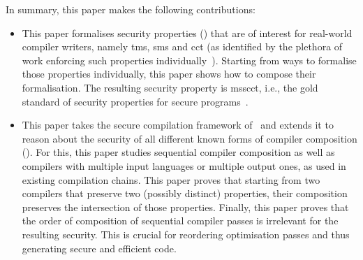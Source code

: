 \documentclass[utf8,acmsmall,review,screen,dvipsnames,anonymous]{acmart}
\begin{document}
In summary, this paper makes the following contributions:
\begin{itemize}
  \item %
        This paper formalises security properties () that are of interest for real-world compiler writers, namely \gls*{tms}, \gls*{sms} and \gls*{cct} (as identified by the plethora of work enforcing such properties individually~\cite{akritidis2009baggy,nagarakatte2009soft,nagarakatte2010cets,dhumbumroong2020boundwarden,jung2021pico,nam2019framer,shankaranarayana2023tailcheck,younan2010paricheck,zhou2023fatptrs,bond2017vale,almeida2017jasmin,kuepper2023cryptopt,cauligi2019fact}).
        Starting from ways to formalise those properties individually, this paper shows how to compose their formalisation.
        The resulting security property is \gls*{msscct}, i.e., the gold standard of security properties for secure programs~\cite{lemay2021ccc}.

  \item %
        This paper takes the secure compilation framework of~\citep{abate2019jour} and extends it to reason about the security of all different known forms of compiler composition ().
        For this, this paper studies sequential compiler composition as well as compilers with multiple input languages or multiple output ones, as used in existing compilation chains.
        This paper proves that starting from two compilers that preserve two (possibly distinct) properties, their composition preserves the intersection of those properties.
        Finally, this paper proves that the order of composition of sequential compiler passes is irrelevant for the resulting security.
        This is crucial for reordering optimisation passes and thus generating secure and efficient code.


\end{itemize}
\end{document}
